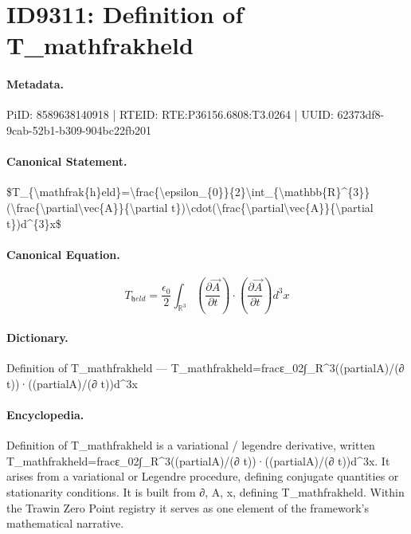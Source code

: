 \section*{ID9311: Definition of T\_mathfrakheld}
\paragraph{Metadata.}
PiID: 8589638140918 | RTEID: RTE:P36156.6808:T3.0264 | UUID: 62373df8-9cab-52b1-b309-904bc22fb201

\paragraph{Canonical Statement.}
\$T\_\{\textbackslash{}mathfrak\{h\}eld\}=\textbackslash{}frac\{\textbackslash{}epsilon\_\{0\}\}\{2\}\textbackslash{}int\_\{\textbackslash{}mathbb\{R\}\textasciicircum{}\{3\}\}(\textbackslash{}frac\{\textbackslash{}partial\textbackslash{}vec\{A\}\}\{\textbackslash{}partial t\})\textbackslash{}cdot(\textbackslash{}frac\{\textbackslash{}partial\textbackslash{}vec\{A\}\}\{\textbackslash{}partial t\})d\textasciicircum{}\{3\}x\$

\paragraph{Canonical Equation.}
\[
T_{\mathfrak{h}eld}=\frac{\epsilon_{0}}{2}\int_{\mathbb{R}^{3}}(\frac{\partial\vec{A}}{\partial t})\cdot(\frac{\partial\vec{A}}{\partial t})d^{3}x
\]

\paragraph{Dictionary.}
Definition of T\_mathfrakheld — T\_mathfrakheld=fracε\_02∫\_R\textasciicircum{}3((partialA)/(∂ t))·((partialA)/(∂ t))d\textasciicircum{}3x

\paragraph{Encyclopedia.}
Definition of T\_mathfrakheld is a variational / legendre derivative, written T\_mathfrakheld=fracε\_02∫\_R\textasciicircum{}3((partialA)/(∂ t))·((partialA)/(∂ t))d\textasciicircum{}3x. It arises from a variational or Legendre procedure, defining conjugate quantities or stationarity conditions. It is built from ∂, A, x, defining T\_mathfrakheld. Within the Trawin Zero Point registry it serves as one element of the framework's mathematical narrative.
